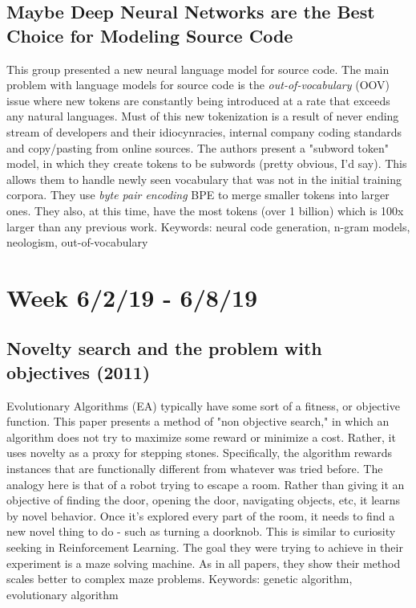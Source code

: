 \documentclass{article}
\begin{document}
\subsection*{Maybe Deep Neural Networks are the Best Choice for Modeling Source Code\cite{karampatsis2019maybe}}

This group presented a new neural language model for source code. The main problem with language models for source code is the \textit{out-of-vocabulary} (OOV) issue where new tokens are constantly being introduced at a rate that exceeds any natural languages. Must of this new tokenization is a result of never ending stream of developers and their idiocynracies, internal company coding standards and copy/pasting from online sources. The authors present a "subword token" model, in which they create tokens to be subwords (pretty obvious, I'd say). This allows them to handle newly seen vocabulary that was not in the initial training corpora. They use \textit{byte pair encoding} BPE to merge smaller tokens into larger ones. They also, at this time, have the most tokens (over 1 billion) which is 100x larger than any previous work.
\newline\newline
Keywords: neural code generation, n-gram models, neologism, out-of-vocabulary

\section*{Week 6/2/19 - 6/8/19}
\subsection*{Novelty search and the problem with objectives (2011)\cite{lehman2011novelty}}

Evolutionary Algorithms (EA) typically have some sort of a fitness, or objective function. This paper presents a method of "non objective search," in which an algorithm does not try to maximize some reward or minimize a cost. Rather, it uses novelty as a proxy for stepping stones. Specifically, the algorithm rewards instances that are functionally different from whatever was tried before. The analogy here is that of a robot trying to escape a room. Rather than giving it an objective of finding the door, opening the door, navigating objects, etc, it learns by novel behavior. Once it's explored every part of the room, it needs to find a new novel thing to do - such as turning a doorknob. This is similar to curiosity seeking in Reinforcement Learning. The goal they were trying to achieve in their experiment is a maze solving machine. As in all papers, they show their method scales better to complex maze problems.
\newline\newline
Keywords: genetic algorithm, evolutionary algorithm
\end{document}
